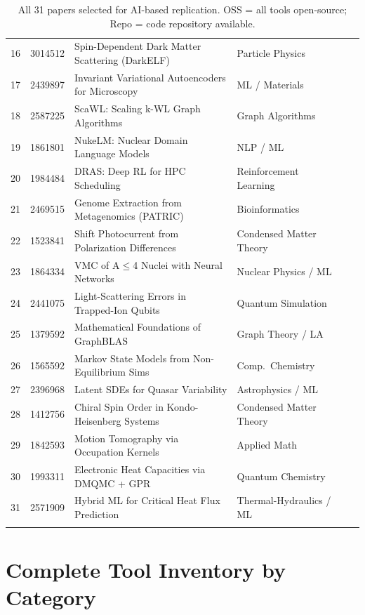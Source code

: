 \documentclass[11pt,letterpaper]{article}
\newcommand{\yes}{\checkmark}
\begin{document}
\begin{landscape}
\begin{longtable}{c l p{6.5cm} l c c}
16 & 3014512 & Spin-Dependent Dark Matter Scattering (DarkELF) & Particle Physics & \yes & \yes \\
17 & 2439897 & Invariant Variational Autoencoders for Microscopy & ML / Materials & \yes & \yes \\
18 & 2587225 & ScaWL: Scaling k-WL Graph Algorithms & Graph Algorithms & \yes & \yes \\
19 & 1861801 & NukeLM: Nuclear Domain Language Models & NLP / ML & \yes & \\
20 & 1984484 & DRAS: Deep RL for HPC Scheduling & Reinforcement Learning & \yes & \yes \\
21 & 2469515 & Genome Extraction from Metagenomics (PATRIC) & Bioinformatics & \yes & \yes \\
22 & 1523841 & Shift Photocurrent from Polarization Differences & Condensed Matter Theory & \yes & \\
23 & 1864334 & VMC of A$\leq$4 Nuclei with Neural Networks & Nuclear Physics / ML & \yes & \\
24 & 2441075 & Light-Scattering Errors in Trapped-Ion Qubits & Quantum Simulation & \yes & \yes \\
25 & 1379592 & Mathematical Foundations of GraphBLAS & Graph Theory / LA & \yes & \\
26 & 1565592 & Markov State Models from Non-Equilibrium Sims & Comp.\ Chemistry & \yes & \yes \\
27 & 2396968 & Latent SDEs for Quasar Variability & Astrophysics / ML & \yes & \yes \\
28 & 1412756 & Chiral Spin Order in Kondo-Heisenberg Systems & Condensed Matter Theory & \yes & \\
29 & 1842593 & Motion Tomography via Occupation Kernels & Applied Math & \yes & \\
30 & 1993311 & Electronic Heat Capacities via DMQMC + GPR & Quantum Chemistry & \yes & \\
31 & 2571909 & Hybrid ML for Critical Heat Flux Prediction & Thermal-Hydraulics / ML & \yes & \\
\bottomrule
\caption{All 31 papers selected for AI-based replication. OSS = all tools open-source; Repo = code repository available.}
\label{tab:papers}
\end{longtable}
\end{landscape}

\section{Complete Tool Inventory by Category}
\end{document}
